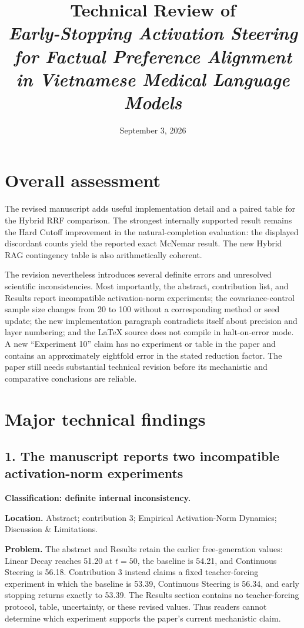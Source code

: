 \documentclass[11pt]{article}
\title{Technical Review of\\
\emph{Early-Stopping Activation Steering for Factual Preference Alignment in Vietnamese Medical Language Models}}
\author{}
\date{September 3, 2026}
\begin{document}
\maketitle

\section*{Overall assessment}

The revised manuscript adds useful implementation detail and a paired table for the Hybrid RRF comparison.  The strongest internally supported result remains the Hard Cutoff improvement in the natural-completion evaluation: the displayed discordant counts yield the reported exact McNemar result.  The new Hybrid RAG contingency table is also arithmetically coherent.

The revision nevertheless introduces several definite errors and unresolved scientific inconsistencies.  Most importantly, the abstract, contribution list, and Results report incompatible activation-norm experiments; the covariance-control sample size changes from 20 to 100 without a corresponding method or seed update; the new implementation paragraph contradicts itself about precision and layer numbering; and the LaTeX source does not compile in halt-on-error mode.  A new ``Experiment 10'' claim has no experiment or table in the paper and contains an approximately eightfold error in the stated reduction factor.  The paper still needs substantial technical revision before its mechanistic and comparative conclusions are reliable.

\section*{Major technical findings}

\subsection*{1. The manuscript reports two incompatible activation-norm experiments}

\textbf{Classification: definite internal inconsistency.}

\textbf{Location.} Abstract; contribution 3; Empirical Activation-Norm Dynamics; Discussion \& Limitations.

\textbf{Problem.} The abstract and Results retain the earlier free-generation values: Linear Decay reaches 51.20 at $t=50$, the baseline is 54.21, and Continuous Steering is 56.18.  Contribution 3 instead claims a fixed teacher-forcing experiment in which the baseline is 53.39, Continuous Steering is 56.34, and early stopping returns exactly to 53.39.  The Results section contains no teacher-forcing protocol, table, uncertainty, or these revised values.  Thus readers cannot determine which experiment supports the paper's current mechanistic claim.
\end{document}
